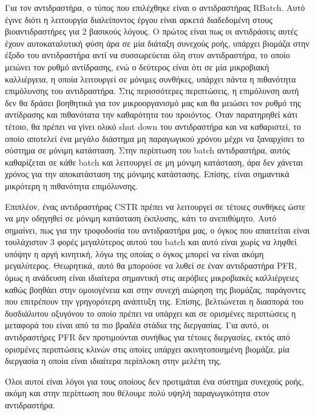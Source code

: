 \documentclass[11pt]{article}
\begin{document}
Για τον αντιδραστήρα, ο τύπος που επιλέχθηκε είναι ο αντιδραστήρας RBatch. Αυτό έγινε διότι η λειτουργία διαλείποντος έργου είναι αρκετά διαδεδομένη στους βιοαντιδραστήρες για 2 βασικούς λόγους. Ο πρώτος είναι πως οι αντιδράσεις αυτές έχουν αυτοκαταλυτική φύση άρα σε μία διάταξη συνεχούς ροής, υπάρχει βιομάζα στην έξοδο του αντιδραστήρα αντί να συσσωρεύεται όλη στον αντιδραστήρα, το οποίο μειώνει τον ρυθμό αντίδρασης, ενώ ο δεύτερος είναι ότι σε μία μικροβιακή καλλιέργεια, η οποία λειτουργεί σε μόνιμες συνθήκες, υπάρχει πάντα η πιθανότητα επιμόλυνσης του αντιδραστήρα. Στις περισσότερες περιπτώσεις, η επιμόλυνση αυτή δεν θα δράσει βοηθητικά για τον μικροοργανισμό μας και θα μειώσει τον ρυθμό της αντίδρασης και πιθανότατα την καθαρότητα του προιόντος. Όταν παρατηρηθεί κάτι τέτοιο, θα πρέπει να γίνει ολικό shut down του αντιδραστήρα και να καθαριστεί, το οποίο αποτελεί ένα μεγάλο διάστημα μη παραγωγικού χρόνου μέχρι να ξαναρχίσει το σύστημα σε μόνιμη κατάσταση. Στην περίπτωση του batch αντιδραστήρα, αυτός καθαρίζεται σε κάθε batch και λειτουργεί σε μη μόνιμη κατάσταση, άρα δεν χάνεται χρόνος για την αποκατάσταση της μόνιμης κατάστασης. Επίσης, είναι σημαντικά μικρότερη η πιθανότητα επιμόλυνσης.

Επιπλέον, ένας αντιδραστήρας CSTR πρέπει να λειτουργεί σε τέτοιες συνθήκες ώστε να μην οδηγηθεί σε μόνιμη κατάσταση έκπλυσης, κάτι το ανεπιθύμητο. Αυτό σημαίνει, πως για την τροφοδοσία του αντιδραστήρα μας, ο όγκος που απαιτείται είναι τουλάχιστον 3 φορές μεγαλύτερος αυτού του batch και αυτό είναι χωρίς να ληφθεί υπόψην η αργή κινητική, λόγω της οποίας ο όγκος μπορεί να είναι ακόμη μεγαλύτερος. Θεωρητικά, αυτό θα μπορούσε να λυθεί σε έναν αντιδραστήρα PFR, όμως η ανάδευση είναι ιδιαίτερα σημαντική στις αερόβιες μικροβιακές καλλιέργειες καθώς βοηθάει στην ομοιογένεια και στην συνεχή αιώρηση της βιομάζας, παράγοντες που επιτρέπουν την γρηγορότερη ανάπτυξη της. Επίσης, βελτιώνεται η διασπορά του δυσδιάλυτου οξυγόνου το οποίο πρέπει να υπάρχει και σε ορισμένες περιπτώσεις η μεταφορά του είναι από τα πιο βραδέα στάδια της διεργασίας. Για αυτό, οι αντιδραστήρες PFR δεν προτιμούνται συνήθως για τέτοιες διεργασίες, εκτός από ορισμένες περιπτώσεις κλινών στις οποίες υπάρχει ακινητοποιημένη βιομάζα, μία διεργασία η οποία είναι ιδιαίτερα περίπλοκη στην μελέτη της.

Όλοι αυτοί είναι λόγοι για τους οποίους δεν προτιμάται ένα σύστημα συνεχούς ροής, ακόμη και στην περίπτωση που θέλουμε πολύ υψηλή παραγωγικότητα στον αντιδραστήρα.
\end{document}
